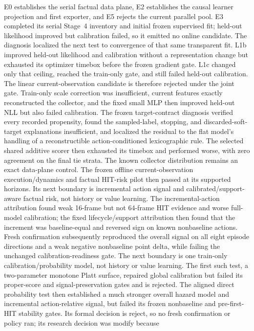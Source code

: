 \documentclass[11pt]{article}
\begin{document}
E0 establishes the serial factual data plane, E2 establishes the causal learner
projection and first exporter, and E5 rejects the current parallel pool.  E3
completed its serial Stage~4 inventory and initial frozen supervised fit;
held-out likelihood improved but calibration failed, so it emitted no online
candidate.
The diagnosis localized the next test to convergence of that same transparent
fit.  L1b improved held-out likelihood and calibration without a representation
change but exhausted its optimizer timebox before the frozen gradient gate.
L1c changed only that ceiling, reached the train-only gate, and still failed
held-out calibration.  The linear current-observation candidate is therefore
rejected under the joint gate.  Train-only scale correction was insufficient,
current features exactly reconstructed the collector, and the fixed small MLP
then improved held-out NLL but also failed calibration.  The frozen
target-contract diagnosis verified every recorded propensity, found the
sampled-label, stopping, and discarded-soft-target explanations insufficient,
and localized the residual to the flat model's handling of a reconstructible
action-conditioned lexicographic rule.  The selected shared additive scorer
then exhausted its timebox and performed worse, with zero agreement on the
final tie strata.  The known collector distribution remains an exact
data-plane control.  The frozen offline current-observation execution/dynamics
and factual HIT-risk pilot then passed at its supported horizons.  Its next
boundary is incremental action signal and calibrated/support-aware factual
risk, not history or value learning.  The incremental-action attribution found
weak 16-frame but not 64-frame HIT evidence and worse full-model calibration;
the fixed lifecycle/support attribution then found that the increment was
baseline-equal and reversed sign on known nonbaseline actions.  Fresh
confirmation subsequently reproduced the overall signal on all eight episode
directions and a weak negative nonbaseline point delta, while failing the
unchanged calibration-readiness gate.  The next boundary is one train-only
calibration/probability model, not history or value learning.  The first such
test, a two-parameter monotone Platt surface, repaired global calibration but
failed its proper-score and signal-preservation gates and is rejected.  The
aligned direct probability test then established a much stronger overall
hazard model and incremental action-relative signal, but failed its frozen
nonbaseline and pre-first-HIT stability gates.  Its formal decision is reject,
so no fresh confirmation or policy ran; its research decision was modify because
\end{document}
